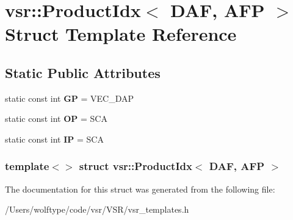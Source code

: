 \hypertarget{structvsr_1_1_product_idx_3_01_d_a_f_00_01_a_f_p_01_4}{\section{vsr\-:\-:Product\-Idx$<$ D\-A\-F, A\-F\-P $>$ Struct Template Reference}
\label{structvsr_1_1_product_idx_3_01_d_a_f_00_01_a_f_p_01_4}
}
\subsection*{Static Public Attributes}
\begin{DoxyCompactItemize}
\item 
\hypertarget{structvsr_1_1_product_idx_3_01_d_a_f_00_01_a_f_p_01_4_adf07cff8249af0546a70b71315f88954}{static const int {\bfseries G\-P} = V\-E\-C\-\_\-\-D\-A\-P}\label{structvsr_1_1_product_idx_3_01_d_a_f_00_01_a_f_p_01_4_adf07cff8249af0546a70b71315f88954}

\item 
\hypertarget{structvsr_1_1_product_idx_3_01_d_a_f_00_01_a_f_p_01_4_ae44f5827cd9a91507c1dfffd408de66d}{static const int {\bfseries O\-P} = S\-C\-A}\label{structvsr_1_1_product_idx_3_01_d_a_f_00_01_a_f_p_01_4_ae44f5827cd9a91507c1dfffd408de66d}

\item 
\hypertarget{structvsr_1_1_product_idx_3_01_d_a_f_00_01_a_f_p_01_4_aad83a795abd5efdfaa35d7bf513401c6}{static const int {\bfseries I\-P} = S\-C\-A}\label{structvsr_1_1_product_idx_3_01_d_a_f_00_01_a_f_p_01_4_aad83a795abd5efdfaa35d7bf513401c6}

\end{DoxyCompactItemize}
\subsubsection*{template$<$$>$ struct vsr\-::\-Product\-Idx$<$ D\-A\-F, A\-F\-P $>$}



The documentation for this struct was generated from the following file\-:\begin{DoxyCompactItemize}
\item 
/\-Users/wolftype/code/vsr/\-V\-S\-R/vsr\-\_\-templates.\-h\end{DoxyCompactItemize}
